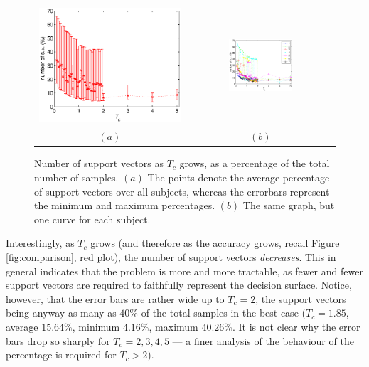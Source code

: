 \documentclass[a4paper,10pt,conference]{ieeeconf}
\begin{document}
\begin{figure}[!t]
  \begin{center}
    \begin{tabular}{cc}
      \includegraphics[width=0.45\linewidth]{SVs.eps} &
      \includegraphics[width=0.45\textwidth]{svs_subj.eps} \\
      $(a)$ & $(b)$
    \end{tabular}
    \caption{Number of support vectors as $T_c$ grows, as a percentage
    of the total number of samples. $(a)$ The points denote the
    average percentage of support vectors over all subjects, whereas
    the errorbars represent the minimum and maximum percentages. $(b)$
    The same graph, but one curve for each subject.}
    \label{fig:svs}
  \end{center}
\end{figure}

Interestingly, as $T_c$ grows (and therefore as the accuracy grows,
recall Figure \ref{fig:comparison}, red plot), the number of support
vectors \emph{decreases}. This in general indicates that the problem
is more and more tractable, as fewer and fewer support vectors are
required to faithfully represent the decision surface. Notice,
however, that the error bars are rather wide up to $T_c=2$, the
support vectors being anyway as many as $40\%$ of the total samples in
the best case ($T_c=1.85$, average $15.64\%$, minimum $4.16\%$,
maximum $40.26\%$. It is not clear why the error bars drop so sharply
for $T_c=2,3,4,5$ --- a finer analysis of the behaviour of the
percentage is required for $T_c>2$).
\end{document}
